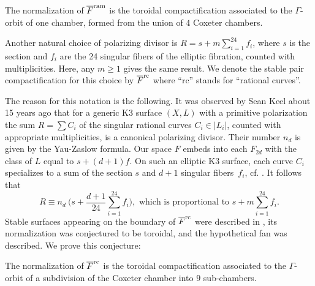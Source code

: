 \documentclass[table,x11names]{amsart}
\begin{document}
\begin{theorem}\label{intro1} The normalization of ${\overline F}^{{\rm ram}}$ is the toroidal compactification
associated to the $\Gamma$-orbit of one chamber, formed from the union of $4$ Coxeter chambers.
\end{theorem}

Another natural choice of polarizing divisor is
$R=s+ m \sum_{i=1}^{24}f_i$, where $s$ is the section and $f_i$ are
the 24 singular fibers of the elliptic fibration, counted with
multiplicities. Here, any
$m\ge1$ gives the same result. We denote the stable pair
compactification for this choice by ${\overline F}^{{\rm rc}}$ where ``rc'' stands
for ``rational curves''.

The reason for this notation is the following. It was observed by Sean Keel
about 15 years ago that for a generic K3 surface $(X,L)$ with a
primitive polarization the sum $R=\sum C_i$ of the singular rational
curves $C_i\in |L_i|$, counted with appropriate multiplicities, is a
canonical polarizing divisor.  Their number $n_d$ is given by the
Yau-Zaslow formula.  Our space $F$ embeds into each $F_{2d}$ with the
class of $L$ equal to $s+(d+1)f$. On such an elliptic K3 surface, each
curve $C_i$ specializes to a sum of the section $s$ and $d+1$ singular
fibers~$f_i$, cf. \cite{bryan2000enumerative-geometry}. It follows
that
\begin{displaymath}
R \equiv n_d\  \big( s + \frac{d+1}{24} \sum_{i=1}^{24} f_i \big),
  \text{ which is proportional to }s+ m\sum_{i=1}^{24} f_i.
\end{displaymath}
Stable surfaces appearing on the boundary of ${\overline F}^{{\rm rc}}$
were described in \cite{brunyate15modular-compactification}, its
normalization was conjectured to be toroidal, and the hypothetical fan
was described. We prove this conjecture:

\begin{theorem}\label{intro2} The normalization of ${\overline F}^{{\rm rc}}$ is the toroidal compactification
associated to the $\Gamma$-orbit of a subdivision of the Coxeter chamber into $9$ sub-chambers.
\end{theorem}
\end{document}
